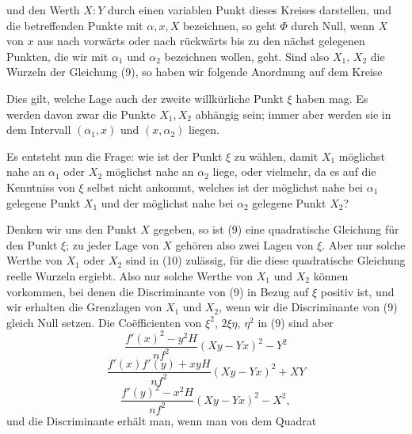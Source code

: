 und den Werth $X:Y$ durch einen variablen Punkt dieses Kreises
darstellen, und die betreffenden Punkte mit $\alpha, x, X$ bezeichnen, so
geht $\Phi$ durch Null, wenn $X$ von $x$ aus nach vorwärts oder nach
rückwärts bis zu den nächst gelegenen Punkten, die wir mit $\alpha_1$ und
$\alpha_2$ bezeichnen wollen, geht. Sind also $X_1$, $X_2$ die Wurzeln der
Gleichung (9), so haben wir folgende Anordnung auf dem Kreise



Dies gilt, welche Lage auch der zweite willkürliche Punkt $\xi$
haben mag. Es werden davon zwar die Punkte $X_1, X_2$ abhängig
sein; immer aber werden sie in dem Intervall $(\alpha_1, x)$ und $(x, \alpha_2)$
liegen.

Es entsteht nun die Frage: wie ist der Punkt $\xi$ zu wählen, damit
$X_1$ möglichst nahe an $\alpha_1$ oder $X_2$ möglichst nahe an $\alpha_2$ liege,
oder vielmehr, da es auf die Kenntniss von $\xi$ selbst nicht ankommt,
welches ist der möglichst nahe bei $\alpha_1$ gelegene Punkt $X_1$ und der
möglichst nahe bei $\alpha_2$ gelegene Punkt $X_2$?

Denken wir uns den Punkt $X$ gegeben, so ist (9) eine
quadratische Gleichung für den Punkt $\xi$; zu jeder Lage von $X$
gehören also zwei Lagen von $\xi$. Aber nur solche Werthe von
$X_1$ oder $X_2$ sind in (10) zulässig, für die diese quadratische
Gleichung reelle Wurzeln ergiebt. Also nur solche Werthe von
$X_1$ und $X_2$ können vorkommen, bei denen die Discriminante von
(9) in Bezug auf $\xi$ positiv ist, und wir erhalten die Grenzlagen
von $X_1$ und $X_2$, wenn wir die Discriminante von (9) gleich
Null setzen. Die Coëfficienten von $\xi^2$, $2\xi\eta$, $\eta^2$ in (9) sind aber
\[
\frac{f'(x)^2 - y^2 H}{nf^2}(Xy - Yx)^2 - Y^2
\]
\[
\frac{f'(x)f'(y) + xyH}{nf^2}(Xy - Yx)^2 + XY
\]
\[
\frac{f'(y)^2 - x^2 H}{nf^2}(Xy - Yx)^2 - X^2,
\]
und die Discriminante erhält man, wenn man von dem Quadrat
